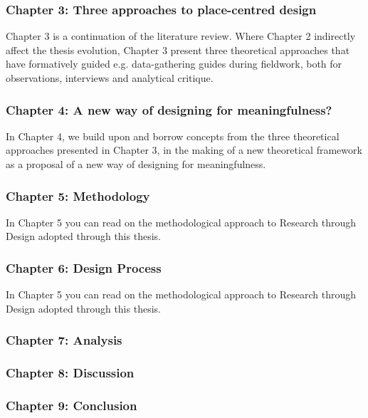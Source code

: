 \subsubsection{Chapter 3: Three approaches to place-centred design }
Chapter 3 is a continuation of the literature review. Where Chapter 2 indirectly affect the thesis evolution, Chapter 3 present three theoretical approaches that have formatively guided e.g. data-gathering guides during fieldwork, both for observations, interviews and analytical critique.

\subsubsection{Chapter 4: A new way of designing for meaningfulness?}
In Chapter 4, we build upon and borrow concepts from the three theoretical approaches presented in Chapter 3, in the making of a new theoretical framework as a proposal of a new way of designing for meaningfulness.

\subsubsection{Chapter 5: Methodology}
In Chapter 5 you can read on the methodological approach to Research through Design adopted through this thesis.  

\subsubsection{Chapter 6: Design Process}
In Chapter 5 you can read on the methodological approach to Research through Design adopted through this thesis.  


\subsubsection{Chapter 7: Analysis}
\subsubsection{Chapter 8: Discussion}
\subsubsection{Chapter 9: Conclusion}

